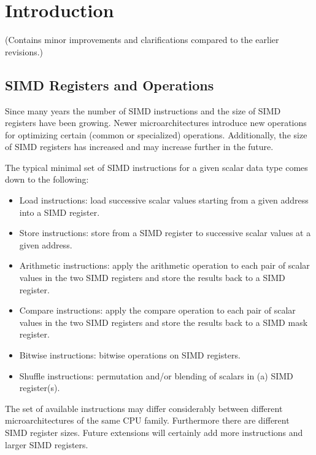 \section{Introduction}
(Contains minor improvements and clarifications compared to the earlier revisions.)

\subsection{SIMD Registers and Operations}
Since many years the number of SIMD instructions and the size of SIMD registers have been growing.
Newer microarchitectures introduce new operations for optimizing certain (common or specialized) operations.
Additionally, the size of SIMD registers has increased and may increase further in the future.

The typical minimal set of SIMD instructions for a given scalar data type comes down to the following:
\begin{itemize}
  \item Load instructions: load  successive scalar values starting from a given address into a SIMD register.
  \item Store instructions: store from a SIMD register to  successive scalar values at a given address.
  \item Arithmetic instructions: apply the arithmetic operation to each pair of scalar values in the two SIMD registers and store the results back to a SIMD register.
  \item Compare instructions: apply the compare operation to each pair of scalar values in the two SIMD registers and store the results back to a SIMD mask register.
  \item Bitwise instructions: bitwise operations on SIMD registers.
  \item Shuffle instructions: permutation and/or blending of scalars in (a) SIMD register(s).
\end{itemize}

The set of available instructions may differ considerably between different microarchitectures of the same CPU family.
Furthermore there are different SIMD register sizes.
Future extensions will certainly add more instructions and larger SIMD registers.

